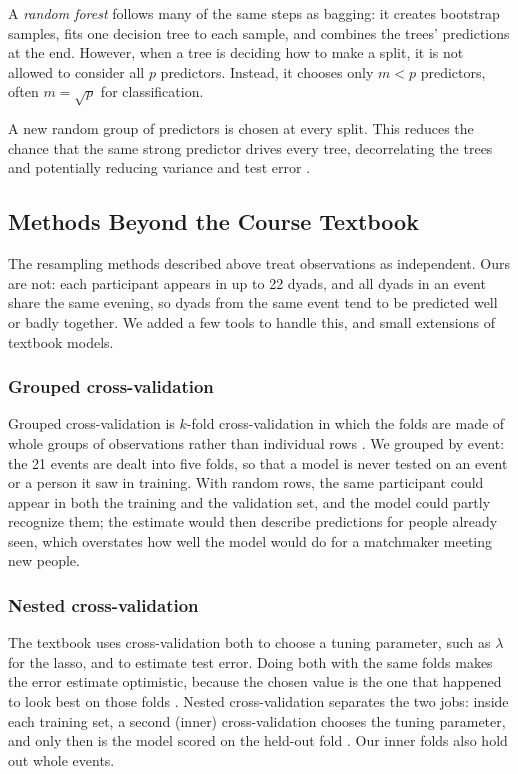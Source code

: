 \documentclass[11pt,letterpaper,reqno]{amsart}
\numberwithin{equation}{subsection}
\theoremstyle{definition}
\numberwithin{thm}{subsection}
\begin{document}
A \textit{random forest} follows many of the same steps as bagging: it creates bootstrap samples, fits one decision tree to each sample, and combines the trees' predictions at the end. However, when a tree is deciding how to make a split, it is not allowed to consider all $p$ predictors. Instead, it chooses only $m<p$ predictors, often $m=\sqrt{p}$ for classification.

A new random group of predictors is chosen at every split. This reduces the chance that the same strong predictor drives every tree, decorrelating the trees and potentially reducing variance and test error \cite[Section 8.2.2, pp. 346--347]{James:2023}.

\subsection{Methods Beyond the Course Textbook}
\label{sec:beyond}

The resampling methods described above treat observations as independent. Ours are not: each participant
appears in up to 22 dyads, and all dyads in an event share the same evening, so dyads from the same event tend to be
predicted well or badly together. We added a few tools to handle this, and small extensions of textbook models.

\subsubsection{Grouped cross-validation}
Grouped cross-validation is $k$-fold cross-validation \cite[Section 5.1.3, pp.~206--208]{James:2023} in which the folds are
made of whole groups of observations rather than individual rows \cite[pp.~917, 919]{Roberts:2017}. We grouped by event:
the 21 events are dealt into five folds, so that a model is never tested on an event or a person it saw in training. With
random rows, the same participant could appear in both the training and the validation set, and the model could
partly recognize them; the estimate would then describe predictions for people already seen, which overstates how well
the model would do for a matchmaker meeting new people.

\subsubsection{Nested cross-validation}
The textbook uses cross-validation both to choose a tuning parameter, such as $\lambda$ for the lasso, and to estimate
test error. Doing both with the same folds makes the error estimate optimistic, because the chosen value is the one
that happened to look best on those folds \cite{Varma:2006}. Nested cross-validation separates the two jobs: inside each
training set, a second (inner) cross-validation chooses the tuning parameter, and only then is the model scored on
the held-out fold \cite[Section 7.10.2, pp.~245--247]{Hastie:2009}. Our inner folds also hold out whole events.
\end{document}
